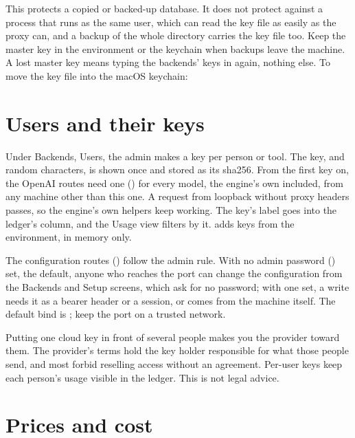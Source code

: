 This protects a copied or backed-up database. It does not protect against a process that runs as the same user, which can read the key file as easily as the proxy can, and a backup of the whole directory carries the key file too. Keep the master key in the environment or the keychain when backups leave the machine. A lost master key means typing the backends' keys in again, nothing else. To move the key file into the macOS keychain:


\section{Users and their keys}\label{sec:users}

Under Backends, Users, the admin makes a key per person or tool. The key,  and random characters, is shown once and stored as its sha256. From the first key on, the OpenAI routes need one () for every model, the engine's own included, from any machine other than this one. A request from loopback without proxy headers passes, so the engine's own helpers keep working. The key's label goes into the ledger's  column, and the Usage view filters by it.  adds keys from the environment, in memory only.

The configuration routes () follow the admin rule. With no admin password () set, the default, anyone who reaches the port can change the configuration from the Backends and Setup screens, which ask for no password; with one set, a write needs it as a bearer header or a session, or comes from the machine itself. The default bind is ; keep the port on a trusted network.

Putting one cloud key in front of several people makes you the provider toward them. The provider's terms hold the key holder responsible for what those people send, and most forbid reselling access without an agreement. Per-user keys keep each person's usage visible in the ledger. This is not legal advice.

\section{Prices and cost}

